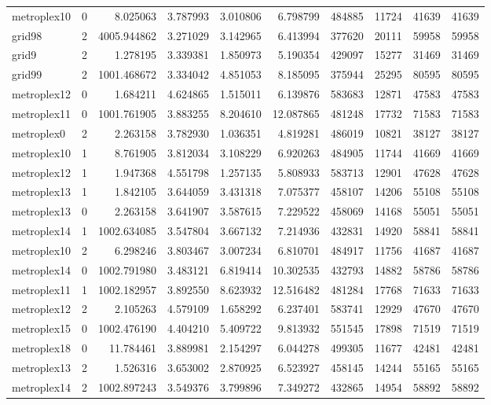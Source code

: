\begin{longtable}{|l|r|r|r|r|r|r|r|r|r|}
metroplex10 & 0 & 8.025063 & 3.787993 & 3.010806 & 6.798799 & 484885 & 11724 & 41639 & 41639 \\
grid98 & 2 & 4005.944862 & 3.271029 & 3.142965 & 6.413994 & 377620 & 20111 & 59958 & 59958 \\
grid9 & 2 & 1.278195 & 3.339381 & 1.850973 & 5.190354 & 429097 & 15277 & 31469 & 31469 \\
grid99 & 2 & 1001.468672 & 3.334042 & 4.851053 & 8.185095 & 375944 & 25295 & 80595 & 80595 \\
metroplex12 & 0 & 1.684211 & 4.624865 & 1.515011 & 6.139876 & 583683 & 12871 & 47583 & 47583 \\
metroplex11 & 0 & 1001.761905 & 3.883255 & 8.204610 & 12.087865 & 481248 & 17732 & 71583 & 71583 \\
metroplex0 & 2 & 2.263158 & 3.782930 & 1.036351 & 4.819281 & 486019 & 10821 & 38127 & 38127 \\
metroplex10 & 1 & 8.761905 & 3.812034 & 3.108229 & 6.920263 & 484905 & 11744 & 41669 & 41669 \\
metroplex12 & 1 & 1.947368 & 4.551798 & 1.257135 & 5.808933 & 583713 & 12901 & 47628 & 47628 \\
metroplex13 & 1 & 1.842105 & 3.644059 & 3.431318 & 7.075377 & 458107 & 14206 & 55108 & 55108 \\
metroplex13 & 0 & 2.263158 & 3.641907 & 3.587615 & 7.229522 & 458069 & 14168 & 55051 & 55051 \\
metroplex14 & 1 & 1002.634085 & 3.547804 & 3.667132 & 7.214936 & 432831 & 14920 & 58841 & 58841 \\
metroplex10 & 2 & 6.298246 & 3.803467 & 3.007234 & 6.810701 & 484917 & 11756 & 41687 & 41687 \\
metroplex14 & 0 & 1002.791980 & 3.483121 & 6.819414 & 10.302535 & 432793 & 14882 & 58786 & 58786 \\
metroplex11 & 1 & 1002.182957 & 3.892550 & 8.623932 & 12.516482 & 481284 & 17768 & 71633 & 71633 \\
metroplex12 & 2 & 2.105263 & 4.579109 & 1.658292 & 6.237401 & 583741 & 12929 & 47670 & 47670 \\
metroplex15 & 0 & 1002.476190 & 4.404210 & 5.409722 & 9.813932 & 551545 & 17898 & 71519 & 71519 \\
metroplex18 & 0 & 11.784461 & 3.889981 & 2.154297 & 6.044278 & 499305 & 11677 & 42481 & 42481 \\
metroplex13 & 2 & 1.526316 & 3.653002 & 2.870925 & 6.523927 & 458145 & 14244 & 55165 & 55165 \\
metroplex14 & 2 & 1002.897243 & 3.549376 & 3.799896 & 7.349272 & 432865 & 14954 & 58892 & 58892 \\

\end{longtable}
